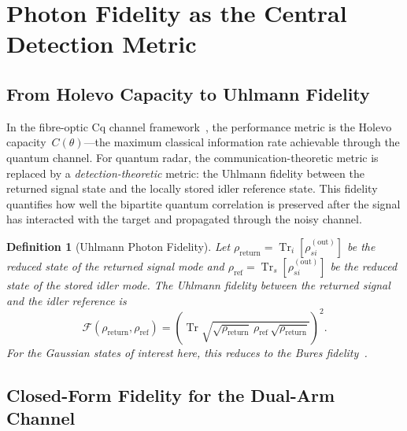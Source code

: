 \documentclass[journal]{IEEEtran}
\newtheorem{definition}{Definition}
\DeclareMathOperator{\Tr}{Tr}
\begin{document}
\section{Photon Fidelity as the Central Detection Metric}\label{sec:fidelity}

\subsection{From Holevo Capacity to Uhlmann Fidelity}

In the fibre-optic Cq channel framework~\cite{gautum2024rigorous}, the performance metric is the Holevo capacity~$C(\theta)$---the maximum classical information rate achievable through the quantum channel. For quantum radar, the communication-theoretic metric is replaced by a \textit{detection-theoretic} metric: the Uhlmann fidelity between the returned signal state and the locally stored idler reference state. This fidelity quantifies how well the bipartite quantum correlation is preserved after the signal has interacted with the target and propagated through the noisy channel.

\begin{definition}[Uhlmann Photon Fidelity]\label{def:uhlmann}
Let $\rho_{\text{return}} = \Tr_i[\rho_{si}^{(\text{out})}]$ be the reduced state of the returned signal mode and $\rho_{\text{ref}} = \Tr_s[\rho_{si}^{(\text{out})}]$ be the reduced state of the stored idler mode. The Uhlmann fidelity between the returned signal and the idler reference is
\begin{equation}\label{eq:uhlmann_fidelity}
\mathcal{F}(\rho_{\text{return}}, \rho_{\text{ref}}) = \left(\Tr\sqrt{\sqrt{\rho_{\text{return}}}\,\rho_{\text{ref}}\,\sqrt{\rho_{\text{return}}}}\right)^2.
\end{equation}
For the Gaussian states of interest here, this reduces to the Bures fidelity~\cite{weedbrook2012gaussian}.
\end{definition}

\subsection{Closed-Form Fidelity for the Dual-Arm Channel}
\end{document}
